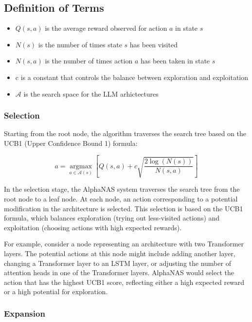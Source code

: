 \documentclass{article}
\begin{document}
\subsection{Definition of Terms}
\begin{itemize}
\item $Q(s,a)$ is the average reward observed for action $a$ in state $s$
\item $N(s)$ is the number of times state $s$ has been visited
\item $N(s,a)$ is the number of times action $a$ has been taken in state $s$
\item c is a constant that controls the balance between exploration and exploitation
\item $\mathcal{A}$ is the search space for the LLM arhictectures
\end{itemize}

\subsubsection{Selection}

Starting from the root node, the algorithm traverses the search tree based on the UCB1 (Upper Confidence Bound 1) formula:

\begin{equation}
a = \underset{a \in \mathcal{A}(s)}{\operatorname{argmax}} \left[Q(s, a) + c \sqrt{\frac{2 \log(N(s))}{N(s, a)}}\right]
\end{equation}


In the selection stage, the AlphaNAS system traverses the search tree from the root node to a leaf node. At each node, an action corresponding to a potential modification in the architecture is selected. This selection is based on the UCB1 formula, which balances exploration (trying out less-visited actions) and exploitation (choosing actions with high expected rewards).

For example, consider a node representing an architecture with two Transformer layers. The potential actions at this node might include adding another layer, changing a Transformer layer to an LSTM layer, or adjusting the number of attention heads in one of the Transformer layers. AlphaNAS would select the action that has the highest UCB1 score, reflecting either a high expected reward or a high potential for exploration.

\subsubsection{Expansion}
\end{document}
